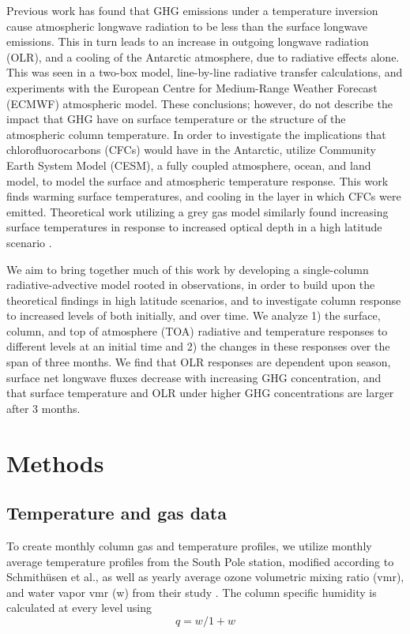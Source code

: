 \documentclass[12]{article}
\begin{document}
Previous work has found that GHG emissions under a temperature inversion cause atmospheric longwave radiation to be less than the surface longwave emissions. This in turn leads to an increase in outgoing longwave radiation (OLR), and a cooling of the Antarctic atmosphere, due to radiative effects alone\citep{schmithusen_how_2015}. This was seen in a two-box model, line-by-line radiative transfer calculations, and experiments with the European Centre for Medium-Range Weather Forecast (ECMWF) atmospheric model. These conclusions; however, do not describe the impact that GHG have on surface temperature or the structure of the atmospheric column temperature. In order to investigate the implications that chlorofluorocarbons (CFCs) would have in the Antarctic, \cite{flanner_climate_2018} utilize Community Earth System Model (CESM), a fully coupled atmosphere, ocean, and land model, to model the surface and atmospheric temperature response. This work finds warming surface temperatures, and cooling in the layer in which CFCs were emitted. Theoretical work utilizing a grey gas model similarly found increasing surface temperatures in response to increased optical depth in a high latitude scenario \citep{payne_conceptual_2015}.

We aim to bring together much of this work by developing a single-column radiative-advective model rooted in observations, in order to build upon the theoretical findings in high latitude scenarios, and to investigate column response to increased levels of  both initially, and over time. We analyze 1) the surface, column, and top of atmosphere (TOA) radiative and temperature responses to different  levels at an initial time and 2) the changes in these responses over the span of three months. We find that OLR responses are dependent upon season, surface net longwave fluxes decrease with increasing GHG concentration, and that surface temperature and OLR under higher GHG concentrations are larger after 3 months.


\section{Methods}
\subsection{Temperature and gas data}
 To create monthly column gas and temperature profiles, we utilize monthly average temperature profiles from the South Pole station, modified according to Schmithüsen et al., as well as yearly average ozone volumetric mixing ratio (vmr), and water vapor vmr (w) from their study  \citep{schmithusen_how_2015}. The column specific humidity is calculated at every level using
\begin{equation}
    q = w/1+w
\end{equation}
\end{document}
